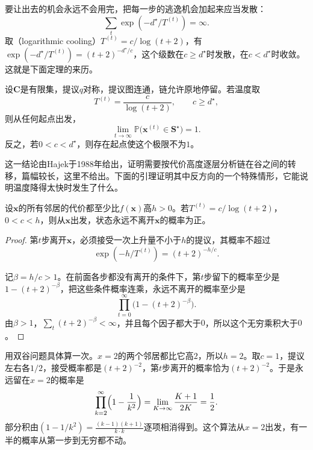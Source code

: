 要让出去的机会永远不会用完，把每一步的逃逸机会加起来应当发散：
\[
 \sum_{t}\exp(-d^\star/T^{(t)})=\infty.
\]
取（logarithmic cooling）$T^{(t)}=c/\log(t+2)$，有$\exp(-d^\star/T^{(t)})=(t+2)^{-d^\star/c}$，这个级数在$c\geq d^\star$时发散，在$c<d^\star$时收敛。这就是下面定理的来历。

\begin{theorem}[对数降温下的全局收敛]
\label{thm:rs-log-cooling}
设$\bm{C}$是有限集，提议$q$对称，提议图连通，链允许原地停留。若温度取
\begin{equation}
 T^{(t)}=\frac{c}{\log(t+2)},\qquad c\geq d^\star,
 \label{eq:rs-log-cooling}
\end{equation}
则从任何起点出发，
\begin{equation}
 \lim_{t\to\infty}\mathbb{P}\bigl(\bm{x}^{(t)}\in\bm{S}^\star\bigr)=1.
 \label{eq:rs-log-cooling-limit}
\end{equation}
反之，若$0<c<d^\star$，则存在起点使这个极限不为$1$。
\end{theorem}

这一结论由Hajek于1988年给出，证明需要按代价高度逐层分析链在谷之间的转移，篇幅较长，这里不给出。下面的引理证明其中反方向的一个特殊情形，它能说明温度降得太快时发生了什么。

\begin{lemma}[降温过快时可能永远停住]
\label{lem:rs-stuck}
设$\bm{x}$的所有邻居的代价都至少比$f(\bm{x})$高$h>0$。若$T^{(t)}=c/\log(t+2)$，$0<c<h$，则从$\bm{x}$出发，状态永远不离开$\bm{x}$的概率为正。
\end{lemma}

\begin{proof}
第$t$步离开$\bm{x}$，必须接受一次上升量不小于$h$的提议，其概率不超过
\[
 \exp(-h/T^{(t)})=(t+2)^{-h/c}.
\]

记$\beta=h/c>1$。在前面各步都没有离开的条件下，第$t$步留下的概率至少是$1-(t+2)^{-\beta}$，把这些条件概率连乘，永远不离开的概率至少是
\[
 \prod_{t=0}^{\infty}\bigl(1-(t+2)^{-\beta}\bigr).
\]
由$\beta>1$，$\sum_t(t+2)^{-\beta}<\infty$，并且每个因子都大于$0$，所以这个无穷乘积大于$0$。
\end{proof}

用双谷问题具体算一次。$x=2$的两个邻居都比它高$2$，所以$h=2$。取$c=1$，提议左右各$1/2$，接受概率都是$(t+2)^{-2}$，第$t$步离开的概率恰为$(t+2)^{-2}$。于是永远留在$x=2$的概率是
\[
 \prod_{k=2}^{\infty}\Bigl(1-\frac{1}{k^2}\Bigr)=\lim_{K\to\infty}\frac{K+1}{2K}=\frac12.
\]
部分积由$(1-1/k^2)=\frac{(k-1)(k+1)}{k\cdot k}$逐项相消得到。这个算法从$x=2$出发，有一半的概率从第一步到无穷都不动。


